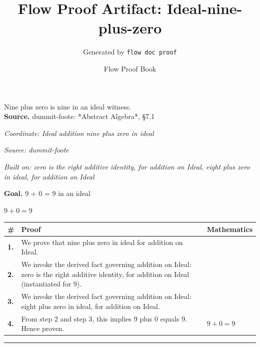 \documentclass[11pt]{article}
\title{Flow Proof Artifact: Ideal-nine-plus-zero}
\author{Generated by \texttt{flow doc proof}}
\date{Flow Proof Book}
\theoremstyle{definition}
\begin{document}
\maketitle
Nine plus zero is nine in an ideal witness.\\[0.5em]
\textbf{Source.} dummit-foote: *Abstract Algebra*, §7.1\\[0.5em]
\bigskip
{}\par
\smallskip\noindent\textit{Coordinate: Ideal \cdot addition \cdot nine plus zero in ideal}\par
\smallskip\noindent\textit{Source: dummit-foote}\par
\smallskip\noindent\textit{Built on: zero is the right additive identity, for addition on Ideal, eight plus zero in ideal, for addition on Ideal}\par
\medskip
\noindent\textbf{Goal.} 9 + 0 = 9 in an ideal\par
\noindent$\displaystyle 9 + 0 = 9$\par
\medskip
\noindent
\begin{tabular}{@{} >{\raggedright\arraybackslash}p{} >{\raggedright\arraybackslash}p{} >{\raggedleft\arraybackslash}p{} @{}}
\textbf{\#} & \textbf{Proof} & \textbf{Mathematics} \\
\midrule
\textbf{1.} & We prove that nine plus zero in ideal for addition on Ideal. & \\[0.45em]
\textbf{2.} & We invoke the derived fact governing addition on Ideal: zero is the right additive identity, for addition on Ideal (instantiated for 9). & \\[0.45em]
\textbf{3.} & We invoke the derived fact governing addition on Ideal: eight plus zero in ideal, for addition on Ideal. & \\[0.45em]
\textbf{4.} & From step 2 and step 3, this implies 9 plus 0 equals 9. Hence proven. & $\displaystyle 9 + 0 = 9$ \\[0.45em]
\bottomrule
\end{tabular}
\label{thm:Ideal-addition-nine_plus_zero_in_ideal}
\par\medskip\hrule
\end{document}
